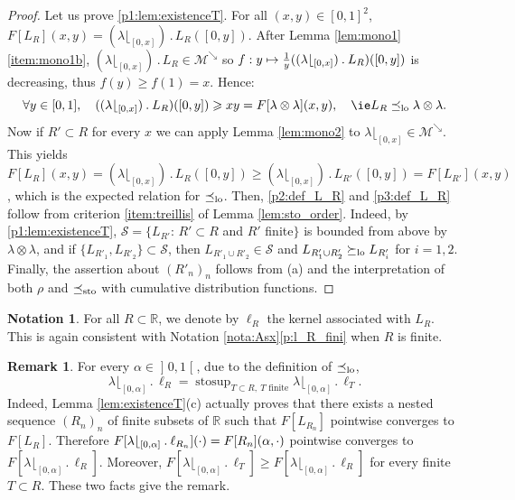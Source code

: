 \documentclass[JEP,XML,SOM,Unicode,NoEqCountersInSection,NoFloatCountersInSection,published]{cedram}
\newcommand{\ldot}{\mathbin{.}}
\newcommand\mto{\mathchoice{\longmapsto}{\mapsto}{\mapsto}{\mapsto}}
\theoremstyle{plain}
\theoremstyle{definition}
\newtheorem{notation}[them]{Notation} %
\newtheorem{rem}[them]{Remark}
\newcommand{\la}{\lambda}
\newcommand{\R}{\mathbb{R}}
\newcommand{\stosup}{\operatorname{stosup}}
\newcommand{\leqs}{\preceq_{\text{\rm sto}}}
\newcommand{\mdec}{\mathcal{M}^{\scriptscriptstyle\searrow}}
\newcommand{\op}{\mathopen}
\newcommand{\clo}{\mathclose}
\newcommand{\leqlc}{\preceq_{\rm lo}}
\newcommand{\geqlc}{\succeq_{\rm lo}}
\begin{document}
\begin{proof} Let us prove \eqref{p1:lem:existenceT}. For all $(x,y)\in[0,1]^2$, $F[L_R](x,y)=(\la\lfloor_{[0,x]})\ldot L_R([0,y])$. After Lemma \ref{lem:mono1}\eqref{item:mono1b}, $(\la\lfloor_{[0,x]})\ldot L_R\in\mdec$ so $f:y\mto\frac1y((\la\lfloor_{[0,x]})\ldot L_R)([0,y])$ is decreasing, thus $f(y)\geq f(1)=x$. Hence:
\[
\forall y\in[0,1],\quad ((\la\lfloor_{[0,x]})\ldot L_R)([0,y])\geqslant xy=F[\la\otimes\la](x,y),\quad \text{\ie} L_R\leqlc \la\otimes\la.
\]
Now if $R'\subset R$ for every $x$ we can apply Lemma \ref{lem:mono2} to $\la\lfloor_{[0,x]}\in\mdec$. This yields $F[L_{R}](x,y)=(\la\lfloor_{[0,x]})\ldot L_{R}([0,y])\geqslant(\la\lfloor_{[0,x]})\ldot L_{R'}([0,y])=F[L_{R'}](x,y)$, which is the expected relation for $\leqlc$. Then, \eqref{p2:def_L_R} and \eqref{p3:def_L_R} follow from criterion \eqref{item:treillis} of Lemma \ref{lem:sto_order}. Indeed, by \eqref{p1:lem:existenceT}, $\mathcal{S}=\{L_{R'}:\,R'\subset R$ and $R'$ finite$\}$ is bounded from above by $\la\otimes\la$, and if $\{L_{R'_1},L_{R'_2}\}\subset\mathcal{S}$, then $L_{R'_1\cup R'_2}\in\mathcal{S}$ and $L_{R'_1\cup R'_2}\geqlc L_{R'_i}$ for $i=1,2$. Finally, the assertion about $(R'_n)_n$ follows from (a) and the interpretation of both $\rho$ and $\leqs$ with cumulative distribution functions.\end{proof}

\begin{notation}\label{nota:kernel_tS}For all $R\subset \R$, we denote by $\ell_R$ the kernel associated with $L_R$. This is again consistent with Notation \ref{nota:Asx}\eqref{p:l_R_fini} when $R$ is finite.
\end{notation}

\begin{rem}For every $\alpha\in \op]0,1\clo[$, due to the definition of $\leqlc$,
\[
\la\lfloor_{[0,\alpha]}{}\ldot\ell_R=\stosup_{T\subset R,\ T\text{ finite}} \la\lfloor_{[0,\alpha]}{}\ldot\ell_T.
\]
Indeed, Lemma \ref{lem:existenceT}(c) actually proves that there exists a nested sequence $(R_n)_n$ of finite subsets of $\R$ such that $F[L_{R_n}]$ pointwise converges to $F[L_R]$. Therefore $F[\la\lfloor_{[0,\alpha]}{}\ldot\nobreak\ell_{R_n}](\cdot)=F[R_n](\alpha,\cdot)$ pointwise converges to $F[\la\lfloor_{[0,\alpha]}{}\ldot\ell_{R}]$. Moreover, $F[\la\lfloor_{[0,\alpha]}{}\ldot\ell_{T}]\!\geq\!F[\la\lfloor_{[0,\alpha]}{}\ldot\ell_{R}]$ for every finite $T\!\subset\! R$. These two facts give the \hbox{remark}.
\end{rem}
\end{document}
